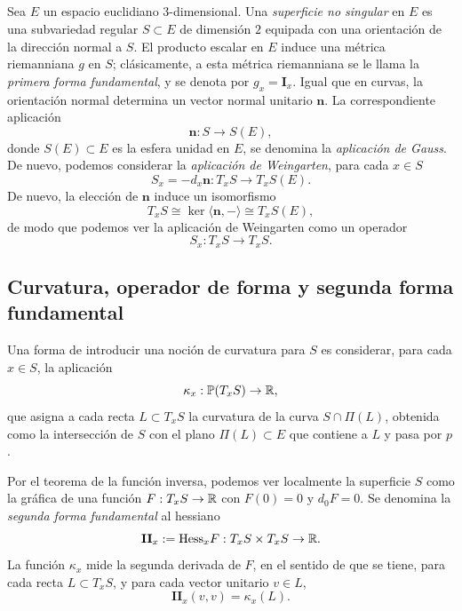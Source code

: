 \documentclass[11pt,a4paper]{amsbook}
\theoremstyle{remark} \newtheorem{rmk}[subsection]{Observación}
\theoremstyle{definition} \newtheorem{defn}[subsection]{Definición}
\theoremstyle{definition} \newtheorem{ex}[subsection]{Ejemplo}
\theoremstyle{definition} \newtheorem{ej}[subsection]{Ejercicio}
\begin{document}
\subsection{} Sea $E$ un espacio euclidiano $3$-dimensional. Una \emph{superficie no singular} en $E$ es una subvariedad regular $S\subset E$ de dimensión $2$ equipada con una orientación de la dirección normal a $S$. El producto escalar en $E$ induce una métrica riemanniana $g$ en $S$; clásicamente, a esta métrica riemanniana se le llama la \emph{primera forma fundamental}, y se denota por $g_x=\mathbf{I}_x$. Igual que en curvas, la orientación normal determina un vector normal unitario $\bm{n}$. La correspondiente aplicación
\begin{equation*}
\bm{n}: S \rightarrow S(E),
\end{equation*}
donde $S(E)\subset E$ es la esfera unidad en $E$, se denomina la \emph{aplicación de Gauss}.
De nuevo, podemos considerar la \emph{aplicación de Weingarten}, para cada $x\in S$
\begin{equation*}
S_x = -d_x \bm{n}: T_xS \rightarrow T_x S(E).
\end{equation*}
De nuevo, la elección de $\bm{n}$ induce un isomorfismo
\begin{equation*}
T_xS \cong \ker \langle\bm{n},-\rangle \cong T_x S(E),
\end{equation*}
de modo que podemos ver la aplicación de Weingarten como un operador
\begin{equation*}
S_x:T_xS\rightarrow T_xS.
\end{equation*}

\subsection{Curvatura, operador de forma y segunda forma fundamental} Una forma de introducir una noción de curvatura para $S$ es considerar, para cada $x\in S$, la aplicación
\begin{equation*}
\kappa_x: \mathbb{P}(T_x S) \rightarrow \mathbb R,
\end{equation*}
que asigna a cada recta $L\subset T_xS$ la curvatura de la curva $S\cap \Pi(L)$, obtenida como la intersección de $S$ con el plano $\Pi(L)\subset E$ que contiene a $L$ y pasa por $p$.

Por el teorema de la función inversa, podemos ver localmente la superficie $S$ como la gráfica de una función $F:T_xS\rightarrow \mathbb R$ con $F(0)=0$ y $d_0 F=0$. Se denomina la \emph{segunda forma fundamental} al hessiano
\begin{equation*}
\mathbf{II}_x:=\mathrm{Hess}_x F: T_xS \times T_x S \rightarrow \mathbb R.
\end{equation*}
La función $\kappa_x$ mide la segunda derivada de $F$, en el sentido de que se tiene, para cada recta $L\subset T_xS$, y para cada vector unitario $v\in L$,
\begin{equation*}
\mathbf{II}_x(v,v) = \kappa_x(L).
\end{equation*}
\end{document}
